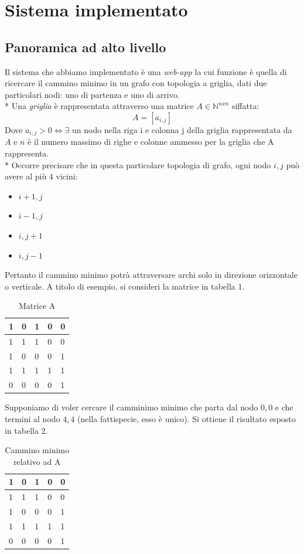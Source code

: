 \chapter{Sistema implementato}
\section{Panoramica ad alto livello}
Il sistema che abbiamo implementato \`e una \emph{web-app} la cui funzione \`e quella di ricercare il cammino minimo in un grafo con topologia a griglia, dati due particolari nodi: uno di partenza e uno di arrivo.\\*
Una \emph{griglia} \`e rappresentata attraverso una matrice $A \in \mathbb{N}^{n x n}$ siffatta:
\[ A=[a_{i,j}] \]
Dove $a_{i,j}>0 \iff \exists $ un nodo nella riga i e colonna j della griglia rappresentata da $A$ e $n$ \`e il numero massimo di righe e colonne ammesso per la griglia che A rappresenta.\\*
Occorre precisare che in questa particolare topologia di grafo, ogni nodo $i,j$ pu\`o avere al pi\`u 4 vicini:
\begin{itemize}
	\item $i+1,j$
	\item $i-1,j$
	\item $i,j+1$
	\item $i,j-1$
\end{itemize} 
Pertanto il cammino minimo potr\`a attraversare archi solo in direzione orizzontale o verticale.\newpage
A titolo di esempio, si consideri la matrice in tabella 1.
\begin{table}[]
	\centering
	\caption{Matrice A}
	\label{my-label}
	\begin{tabular}{|l|l|l|l|l|}
		\hline
		1 & 0 & 1 & 0 & 0 \\ \hline
		1 & 1 & 1 & 0 & 0 \\ \hline
		1 & 0 & 0 & 0 & 1 \\ \hline
		1 & 1 & 1 & 1 & 1 \\ \hline
		0 & 0 & 0 & 0 & 1 \\ \hline
	\end{tabular}
\end{table}
Supponiamo di voler cercare il camminimo minimo che parta dal nodo $0,0$ e che termini al nodo $4,4$ (nella fattispecie, esso \`e unico).
Si ottiene il risultato esposto in tabella 2.
\begin{table}[]
	\centering
	\caption{Cammino minimo relativo ad A}
	\label{my-label}
	\begin{tabular}{|l|l|l|l|l|}
		\hline
		\cellcolor[HTML]{68CBD0}1 & 0 & 1 & 0 & 0                         \\ \hline
		\cellcolor[HTML]{68CBD0}1 & 1 & 1 & 0 & 0                         \\ \hline
		\cellcolor[HTML]{68CBD0}1 & 0 & 0 & 0 & 1                         \\ \hline
		\rowcolor[HTML]{68CBD0} 
		1                         & 1 & 1 & 1 & 1                         \\ \hline
		0                         & 0 & 0 & 0 & \cellcolor[HTML]{68CBD0}1 \\ \hline
	\end{tabular}
\end{table}
